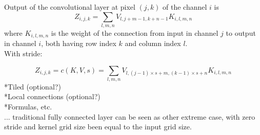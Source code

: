 \documentclass[]{article}
\begin{document}
Output of the convolutional layer at pixel $(j, k)$ of the channel $i$ is
\[
Z_{i, j, k} = \sum_{l, m, n} V_{l, j + m -1, k + n -1} K_{i, l, m, n}
\]
where $K_{i, l, m, n}$ is the weight of the connection from input in channel $j$
to output in channel $i$, both having row index $k$ and column index $l$.\\
With stride:

\[
Z_{i, j, k} = c(K, V, s) =
\sum_{l, m, n} V_{l, (j -1)\times s + m, (k-1)\times s + n} K_{i, l, m, n}
\]
*Tiled (optional?)\\
*Local connections (optional?)\\
*Formulas, etc.\\
... traditional fully connected layer can be seen
as other extreme case, with zero stride and kernel grid size been equal to the
input grid size.

%
%
%
%
%
%
%
%
\end{document}
